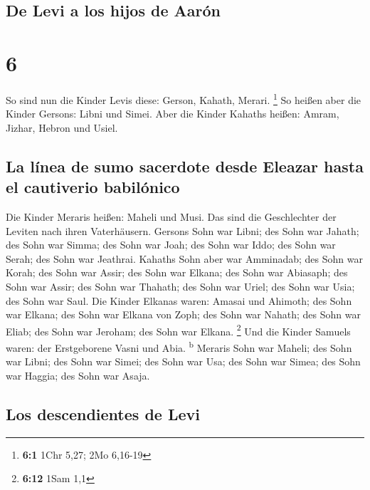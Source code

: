 \hypertarget{de-levi-a-los-hijos-de-aaruxf3n}{%
\subsection{De Levi a los hijos de
Aarón}\label{de-levi-a-los-hijos-de-aaruxf3n}}

\hypertarget{section-5}{%
\section{6}\label{section-5}}

 So sind nun die Kinder Levis diese: Gerson, Kahath,
Merari. \footnote{\textbf{6:1} 1Chr 5,27; 2Mo 6,16-19}  So
heißen aber die Kinder Gersons: Libni und Simei.  Aber die
Kinder Kahaths heißen: Amram, Jizhar, Hebron und Usiel.

\hypertarget{la-luxednea-de-sumo-sacerdote-desde-eleazar-hasta-el-cautiverio-babiluxf3nico}{%
\subsection{La línea de sumo sacerdote desde Eleazar hasta el cautiverio
babilónico}\label{la-luxednea-de-sumo-sacerdote-desde-eleazar-hasta-el-cautiverio-babiluxf3nico}}

 Die Kinder Meraris heißen: Maheli und Musi. Das sind die
Geschlechter der Leviten nach ihren Vaterhäusern.  Gersons
Sohn war Libni; des Sohn war Jahath; des Sohn war Simma; 
des Sohn war Joah; des Sohn war Iddo; des Sohn war Serah; des Sohn war
Jeathrai.  Kahaths Sohn aber war Amminadab; des Sohn war
Korah; des Sohn war Assir;  des Sohn war Elkana; des Sohn
war Abiasaph; des Sohn war Assir;  des Sohn war Thahath;
des Sohn war Uriel; des Sohn war Usia; des Sohn war Saul.
 Die Kinder Elkanas waren: Amasai und Ahimoth;
 des Sohn war Elkana; des Sohn war Elkana von Zoph; des
Sohn war Nahath;  des Sohn war Eliab; des Sohn war
Jeroham; des Sohn war Elkana. \footnote{\textbf{6:12} 1Sam 1,1}
 Und die Kinder Samuels waren: der Erstgeborene Vasni und
Abia. \textsuperscript{b}  Meraris Sohn war Maheli; des
Sohn war Libni; des Sohn war Simei; des Sohn war Usa; 
des Sohn war Simea; des Sohn war Haggia; des Sohn war Asaja.

\hypertarget{los-descendientes-de-levi}{%
\subsection{Los descendientes de Levi}\label{los-descendientes-de-levi}}

